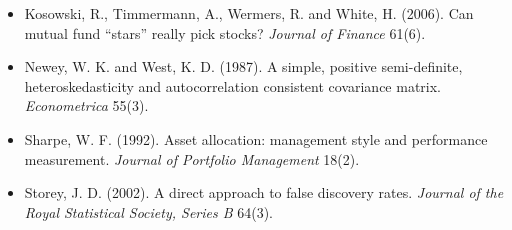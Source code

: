 \documentclass[11pt]{article}
\begin{document}
\begin{small}
\begin{itemize}[leftmargin=1em,label={}]
\item Kosowski, R., Timmermann, A., Wermers, R. and White, H. (2006). Can mutual fund ``stars'' really pick stocks? \textit{Journal of Finance} 61(6).
\item Newey, W. K. and West, K. D. (1987). A simple, positive semi-definite, heteroskedasticity and autocorrelation consistent covariance matrix. \textit{Econometrica} 55(3).
\item Sharpe, W. F. (1992). Asset allocation: management style and performance measurement. \textit{Journal of Portfolio Management} 18(2).
\item Storey, J. D. (2002). A direct approach to false discovery rates. \textit{Journal of the Royal Statistical Society, Series B} 64(3).
\end{itemize}
\end{small}
\end{document}
